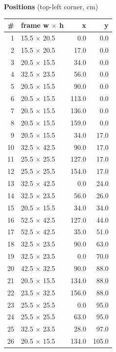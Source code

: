 \documentclass[a4paper,landscape,10pt]{article}
\begin{document}
\begin{minipage}[t]{0.25\textwidth}
\vspace{8pt}
{\bfseries Positions} (top-left corner, cm)\\[2pt]
\tiny
\begin{tabular}{@{}r l r r@{}}
\toprule
\# & frame w $\times$ h & x & y \\
\midrule
1 & 15.5 $\times$ 20.5 & 0.0 & 0.0 \\
2 & 15.5 $\times$ 20.5 & 17.0 & 0.0 \\
3 & 20.5 $\times$ 15.5 & 34.0 & 0.0 \\
4 & 32.5 $\times$ 23.5 & 56.0 & 0.0 \\
5 & 20.5 $\times$ 15.5 & 90.0 & 0.0 \\
6 & 20.5 $\times$ 15.5 & 113.0 & 0.0 \\
7 & 20.5 $\times$ 15.5 & 136.0 & 0.0 \\
8 & 20.5 $\times$ 15.5 & 159.0 & 0.0 \\
9 & 20.5 $\times$ 15.5 & 34.0 & 17.0 \\
10 & 32.5 $\times$ 42.5 & 90.0 & 17.0 \\
11 & 25.5 $\times$ 25.5 & 127.0 & 17.0 \\
12 & 25.5 $\times$ 25.5 & 154.0 & 17.0 \\
13 & 32.5 $\times$ 42.5 & 0.0 & 24.0 \\
14 & 32.5 $\times$ 23.5 & 56.0 & 26.0 \\
15 & 20.5 $\times$ 15.5 & 34.0 & 34.0 \\
16 & 52.5 $\times$ 42.5 & 127.0 & 44.0 \\
17 & 52.5 $\times$ 42.5 & 35.0 & 51.0 \\
18 & 32.5 $\times$ 23.5 & 90.0 & 63.0 \\
19 & 32.5 $\times$ 23.5 & 0.0 & 70.0 \\
20 & 42.5 $\times$ 32.5 & 90.0 & 88.0 \\
21 & 20.5 $\times$ 15.5 & 134.0 & 88.0 \\
22 & 23.5 $\times$ 32.5 & 156.0 & 88.0 \\
23 & 25.5 $\times$ 25.5 & 0.0 & 95.0 \\
24 & 25.5 $\times$ 25.5 & 63.0 & 95.0 \\
25 & 32.5 $\times$ 23.5 & 28.0 & 97.0 \\
26 & 20.5 $\times$ 15.5 & 134.0 & 105.0 \\
\bottomrule
\end{tabular}
\end{minipage}
\clearpage
\end{document}

